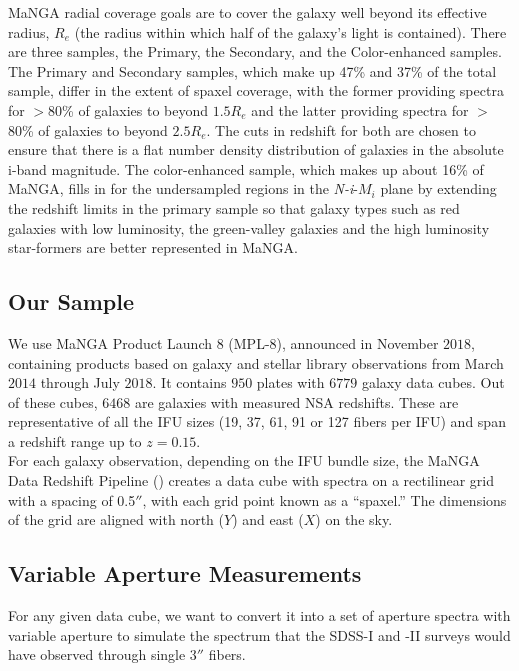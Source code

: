MaNGA radial coverage goals are to cover the galaxy 
well beyond its effective radius, $R_{e}$ (the radius 
within which half of the galaxy's light is contained). 
There are three samples, the Primary, the Secondary, 
and the Color-enhanced samples. The Primary and Secondary 
samples, which make up 47\% and 37\% of the total sample, 
differ in the extent of spaxel coverage, with the 
former providing spectra for $>$80\% of galaxies to 
beyond $1.5R_{e}$ and the latter providing spectra
for $>$80\% of galaxies to beyond $2.5R_{e}$.  
The cuts in redshift for both are chosen to ensure 
that there is a flat number density distribution of 
galaxies in the absolute i-band magnitude. The 
color-enhanced sample, which makes up about 16\% 
of MaNGA, fills in for the undersampled regions in 
the \emph{N-i}-$M_{i}$ plane by extending the 
redshift limits in the primary sample so that 
galaxy types such as red galaxies with low luminosity, 
the green-valley galaxies and the high luminosity 
star-formers are better represented in MaNGA.\\

\subsection{Our Sample}

We use MaNGA Product Launch 8 (MPL-$8$), 
announced in November $2018$, containing products 
based on galaxy and stellar library observations from 
March $2014$ through July $2018$.
It contains $950$ plates with $6779$ galaxy data cubes.
Out of these cubes, $6468$ are galaxies with measured 
NSA redshifts. These are representative of all the 
IFU sizes (19, 37, 61, 91 or 127 fibers per IFU) and 
span a redshift range up to $z = 0.15$.\\

For each galaxy observation, depending on the IFU 
bundle size, the MaNGA Data Redshift Pipeline 
(\citealt{law_data_2016}) creates a data cube with
spectra on a rectilinear grid with a spacing of 
0.5$''$, with each grid point known as a ``spaxel.'' 
The dimensions of the grid are aligned with north
($Y$) and east ($X$) on the sky.

\subsection{Variable Aperture Measurements}
\label{sec:chap2methods}
For any given data cube, we want to convert it into
a set of aperture spectra with variable aperture to 
simulate the spectrum that the SDSS-I and -II
surveys would have observed through single 3$''$ fibers.

